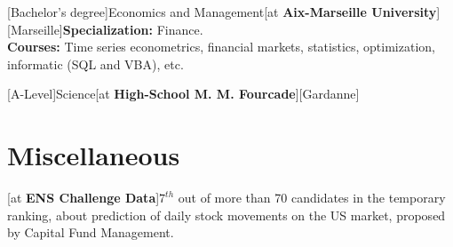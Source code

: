 \documentclass[a4paper]{arthur-cv}
\begin{document}
\begin{textblock}{20.5}
\begin{minipage}[t]{0.61\textwidth}
\begin{rightenv}
        [Bachelor's degree]{Economics and Management}[at \textbf{Aix-Marseille University}][Marseille]{\textbf{Specialization:} Finance.\\\textbf{Courses:} Time series econometrics, financial markets, statistics, optimization, informatic (SQL and VBA), etc.}

        [A-Level]{Science}[at \textbf{High-School M. M. Fourcade}][Gardanne]{}
      \end{rightenv}

    \section{Miscellaneous}
      \begin{rightenv}
        [at \textbf{ENS Challenge Data}]{$7^{th}$ out of more than 70 candidates in the temporary ranking, about prediction of daily stock movements on the US market, proposed by Capital Fund Management.}


      \end{rightenv}

  \end{minipage}

\end{textblock}
\end{document}
